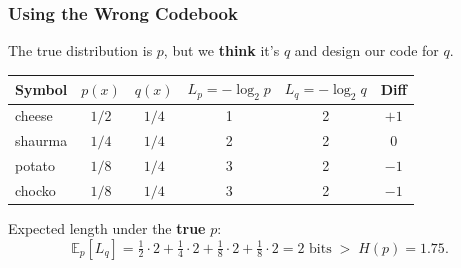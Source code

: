 \documentclass[aspectratio=169]{beamer}
\begin{document}
\begin{frame}
\frametitle{Using the Wrong Codebook}

\small
The true distribution is $p$, but we \textbf{think} it's $q$ and design our code for $q$.

\vspace{0.1cm}
\begin{center}
\renewcommand{\arraystretch}{1.3}
\begin{tabular}{lccccc}
  \textbf{Symbol} & $p(x)$ & $q(x)$ & $L_p = -\log_2 p$ & $L_q = -\log_2 q$ & \textbf{Diff} \\
  \hline
  cheese  & $1/2$ & $1/4$ & 1 & 2 & \textcolor{sampred}{$+1$} \\
  shaurma & $1/4$ & $1/4$ & 2 & 2 & $0$ \\
  potato  & $1/8$ & $1/4$ & 3 & 2 & \textcolor{paramgreen}{$-1$} \\
  chocko  & $1/8$ & $1/4$ & 3 & 2 & \textcolor{paramgreen}{$-1$} \\
  \hline
\end{tabular}
\end{center}

\vspace{0.0cm}
\begin{center}
\end{center}

\pause
Expected length under the \textbf{true} $p$:
\vspace{-0.15cm}
$$\mathbb{E}_p[L_q] = \tfrac{1}{2}\cdot 2 + \tfrac{1}{4}\cdot 2 + \tfrac{1}{8}\cdot 2 + \tfrac{1}{8}\cdot 2 = 2 \text{ bits} \;>\; H(p) = 1.75.$$

\pause
\vspace{-0.15cm}
\begin{center}
\end{center}
\end{frame}
\end{document}
